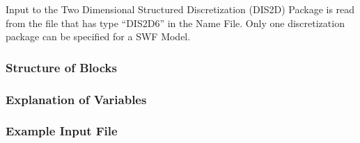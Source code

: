 Input to the Two Dimensional Structured Discretization (DIS2D) Package is read from the file that has type ``DIS2D6'' in the Name File.  Only one discretization package can be specified for a SWF Model.


\vspace{5mm}
\subsubsection{Structure of Blocks}




\vspace{5mm}
\subsubsection{Explanation of Variables}
\begin{description}

\end{description}

\vspace{5mm}
\subsubsection{Example Input File}

